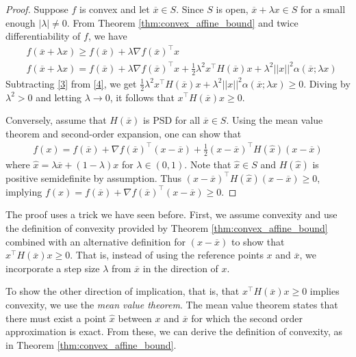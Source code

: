 \begin{proof}
Suppose $f$ is convex and let $\overline{x} \in S$. Since $S$ is open, $\overline{x} + \lambda x \in S$ for a small enough $|\lambda| \neq 0$. From Theorem \ref{thm:convex_affine_bound} and twice differentiability of $f$, we have 
%
\begin{align}
	&f(\overline{x} + \lambda x) \geq f(\overline{x}) + \lambda\nabla f(\overline{x})^\top x \label{3}\\ 
	&f(\overline{x} + \lambda x) =  f(\overline{x}) + \lambda \nabla f(\overline{x})^\top x + \frac{1}{2}\lambda^2 x^\top H(\overline{x})x + \lambda^2||x||^2\alpha(\overline{x};\lambda x) \label{4}
\end{align}
%
Subtracting \eqref{3} from \eqref{4}, we get 
$\frac{1}{2}\lambda^2x^\top H(\overline{x})x + \lambda^2||x||^2\alpha(\overline{x}; \lambda x) \geq 0$. Diving by $\lambda^2 > 0$ and letting $\lambda \rightarrow 0$, it follows that $x^\top H(\overline{x})x \geq 0$.

Conversely, assume that $H(\overline{x})$ is PSD for all $\overline{x} \in S$. Using the mean value theorem and second-order expansion, one can show that
%
\begin{align*}
	f(x) = f(\overline{x}) + \nabla f(\overline{x})^\top(x - \overline{x}) + \frac{1}{2}(x-\overline{x})^\top H(\hat{x})(x - \overline{x})
\end{align*}
%
where $\hat{x} = \lambda \overline{x} + (1-\lambda) x$ for $\lambda \in (0,1)$. Note that $\hat{x} \in S$ and $H(\hat{x})$ is positive semidefinite by assumption. Thus \hspace{-2pt}$(x-\overline{x})^\top H(\hat{x})(x - \overline{x}) \geq 0$, implying $f(x) = f(\overline{x}) + \nabla f(\overline{x})^\top(x - \overline{x}) \geq 0$.
\end{proof}
%
The proof uses a trick we have seen before. First, we assume convexity and use the definition of convexity provided by Theorem \ref{thm:convex_affine_bound} combined with an alternative definition for $(x - \overline{x})$ to show that $x^\top H(\overline{x})x \geq 0$. That is, instead of using the reference points $x$ and $\overline{x}$, we incorporate a step size $\lambda$ from $\overline{x}$ in the direction of $x$. 

To show the other direction of implication, that is, that $x^\top H(\overline{x})x \geq 0$ implies convexity, we use the \emph{mean value theorem}. The mean value theorem states that there must exist a point $\hat{x}$ between $x$ and $\overline{x}$ for which the second order approximation is exact. From these, we can derive the definition of convexity, as in Theorem \ref{thm:convex_affine_bound}.

